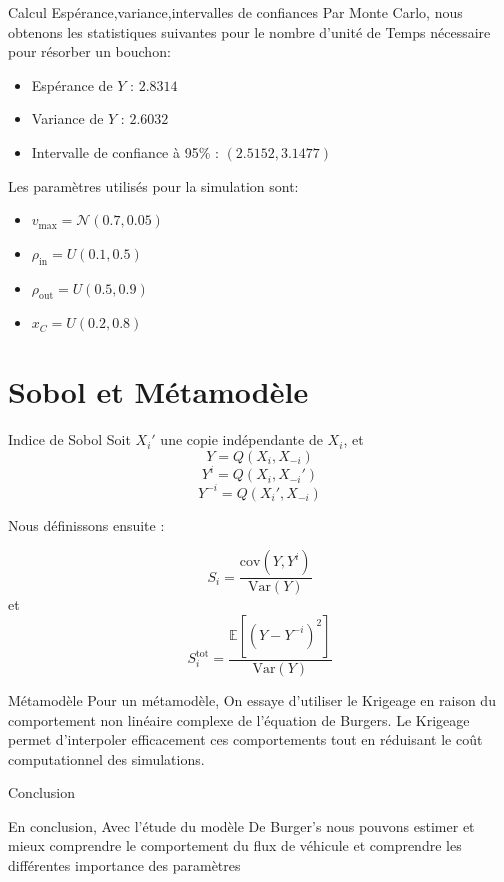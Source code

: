 \documentclass[10pt]{beamer}
\begin{document}
\begin{frame}{Calcul Espérance,variance,intervalles de confiances}
    Par Monte Carlo, nous obtenons les statistiques suivantes pour le nombre d'unité de Temps nécessaire pour résorber un bouchon: 
    \begin{itemize}
        \item Espérance de \( Y \) : \( 2.8314 \)
        \item Variance de \( Y \) : \( 2.6032 \)
        \item Intervalle de confiance à 95\% : \( (2.5152, 3.1477) \)
    \end{itemize}
    
    Les paramètres utilisés pour la simulation sont: 
    \begin{itemize}
        \item \( v_{\text{max}} = \mathcal{N}(0.7, 0.05) \)
        \item \( \rho_{\text{in}} = U(0.1, 0.5) \)
        \item \( \rho_{\text{out}} = U(0.5, 0.9) \)
        \item \( x_C = U(0.2, 0.8) \)
    \end{itemize}
\end{frame}


\section{Sobol et Métamodèle}

\begin{frame}{Indice de Sobol}
    Soit \( X_i' \) une copie indépendante de \( X_i \), et
    \[
    Y = Q(X_i, X_{-i})
    \]
    \[
    Y^i = Q(X_i, X_{-i}')
    \]
    \[
    Y^{-i} = Q(X_i', X_{-i})
    \]
    
    Nous définissons ensuite :
    
    \[
    S_i = \frac{\text{cov}(Y, Y^i)}{\text{Var}(Y)}
    \]
    et
    \[
    S_i^{\text{tot}} = \frac{\mathbb{E} \left[ (Y - Y^{-i})^2 \right]}{\text{Var}(Y)}
    \]
    

\end{frame}

\begin{frame}{Métamodèle}
    Pour un métamodèle, On essaye d'utiliser le Krigeage en raison du comportement non linéaire complexe de l'équation de Burgers. 
    Le Krigeage permet d'interpoler efficacement ces comportements tout en réduisant le coût computationnel des simulations. 

\end{frame}

\begin{frame}{Conclusion}
    
        En conclusion, Avec l'étude du modèle De Burger's nous pouvons estimer et mieux comprendre le comportement du flux de véhicule et comprendre les différentes importance des paramètres
    

\end{frame}
\end{document}
